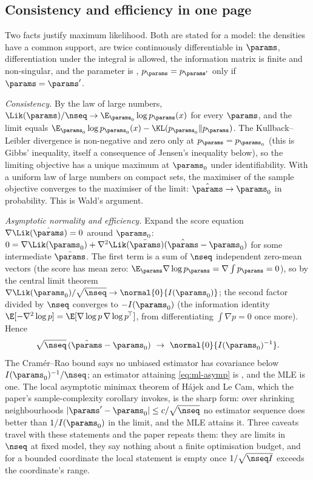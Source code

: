 \subsection{Consistency and efficiency in one page}

Two facts justify maximum likelihood. Both are stated for a  model: the
densities have a common support, are twice continuously differentiable in $\params$,
differentiation under the integral is allowed, the information matrix is finite and
non-singular, and the parameter is , $p_\params=p_{\params'}$ only if
$\params=\params'$.

\emph{Consistency.} By the law of large numbers, $\Lik(\params)/\nseq\to\E_{\params_0}\log p_\params(x)$
for every $\params$, and the limit equals $\E_{\params_0}\log p_{\params_0}(x)-\KL(p_{\params_0}\|p_\params)$.
The Kullback--Leibler divergence is non-negative and zero only at $p_\params=p_{\params_0}$
(this is Gibbs' inequality, itself a consequence of Jensen's inequality below), so the
limiting objective has a unique maximum at $\params_0$ under identifiability. With a
uniform law of large numbers on compact sets, the maximiser of the sample objective
converges to the maximiser of the limit: $\hat\params\to\params_0$ in probability. This
is Wald's argument.

\emph{Asymptotic normality and efficiency.} Expand the score equation
$\nabla\Lik(\hat\params)=0$ around $\params_0$:
$0=\nabla\Lik(\params_0)+\nabla^2\Lik(\bar\params)(\hat\params-\params_0)$ for some
intermediate $\bar\params$. The first term is a sum of $\nseq$ independent zero-mean
vectors (the score has mean zero: $\E_\params\nabla\log p_\params=\nabla\int p_\params=0$),
so by the central limit theorem $\nabla\Lik(\params_0)/\sqrt{\nseq}\to\normal{0}{I(\params_0)}$;
the second factor divided by $\nseq$ converges to $-I(\params_0)$ (the information
identity $\E[-\nabla^2\log p]=\E[\nabla\log p\,\nabla\log p^{\!\top}]$, from differentiating
$\int\nabla p=0$ once more). Hence
\begin{equation}
  \sqrt{\nseq}\,(\hat\params-\params_0)\ \to\ \normal{0}{I(\params_0)^{-1}}.
  \label{eq:ml-asymp}
\end{equation}
The Cram\'er--Rao bound says no unbiased estimator has covariance below $I(\params_0)^{-1}/\nseq$;
an estimator attaining \cref{eq:ml-asymp} is , and the
MLE is one. The local asymptotic minimax theorem of H\'ajek and Le Cam, which the
paper's sample-complexity corollary invokes, is the sharp form: over shrinking neighbourhoods
$|\params'-\params_0|\le c/\sqrt\nseq$ no estimator sequence does better than
$1/I(\params_0)$ in the limit, and the MLE attains it. Three caveats travel with these
statements and the paper repeats them: they are limits in $\nseq$ at fixed model, they
say nothing about a finite optimisation budget, and for a bounded coordinate the local
statement is empty once $1/\sqrt{\nseq I}$ exceeds the coordinate's range.

